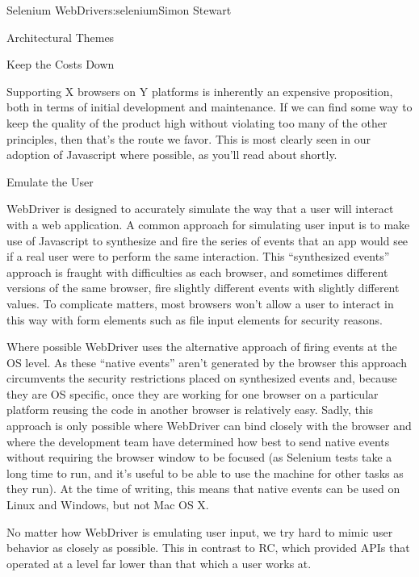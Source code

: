 \begin{aosachapter}{Selenium WebDriver}{s:selenium}{Simon Stewart}
\begin{aosasect1}{Architectural Themes}
\begin{aosaitemize}
\end{aosaitemize}

\begin{aosasect2}{Keep the Costs Down}

Supporting X browsers on Y platforms is inherently an expensive
proposition, both in terms of initial development and maintenance. If
we can find some way to keep the quality of the product high without
violating too many of the other principles, then that's the route we
favor. This is most clearly seen in our adoption of Javascript where
possible, as you'll read about shortly.

\end{aosasect2}

\begin{aosasect2}{Emulate the User}

WebDriver is designed to accurately simulate the way that a user will
interact with a web application. A common approach for simulating user
input is to make use of Javascript to synthesize and fire the series
of events that an app would see if a real user were to perform the
same interaction. This ``synthesized events'' approach is fraught with
difficulties as each browser, and sometimes different versions of the
same browser, fire slightly different events with slightly different
values. To complicate matters, most browsers won't allow a user to
interact in this way with form elements such as file input
elements for security reasons.

Where possible WebDriver uses the alternative approach of firing
events at the OS level. As these ``native events'' aren't generated by
the browser this approach circumvents the security restrictions placed
on synthesized events and, because they are OS specific, once they are
working for one browser on a particular platform reusing the code in
another browser is relatively easy. Sadly, this approach is only
possible where WebDriver can bind closely with the browser
and where the development team have determined how best to send
native events without requiring the browser window to be focused
(as Selenium tests take a long time to run, and it's useful to be
able to use the machine for other tasks as they run). At the time
of writing, this means that native events can be used on Linux and
Windows, but not Mac OS X.

No matter how WebDriver is emulating user input, we try hard to mimic
user behavior as closely as possible. This in contrast to RC, which
provided APIs that operated at a level far lower than that which a
user works at.


\end{aosasect2}
\end{aosasect1}
\end{aosachapter}

